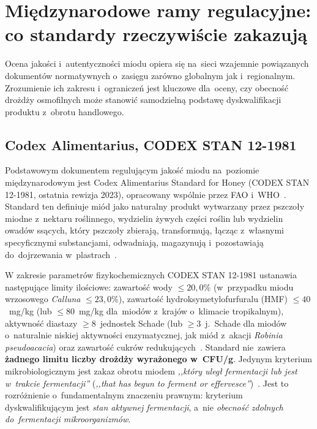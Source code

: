 
\section{Międzynarodowe ramy regulacyjne: co standardy rzeczywiście zakazują}

Ocena jakości i~autentyczności miodu opiera się na~sieci wzajemnie
powiązanych dokumentów normatywnych o~zasięgu zarówno globalnym jak i~regionalnym.
Zrozumienie ich zakresu i~ograniczeń jest kluczowe dla~oceny, czy obecność drożdży osmofilnych może stanowić samodzielną podstawę
dyskwalifikacji produktu z~obrotu handlowego. 

\subsection{Codex Alimentarius, CODEX STAN 12-1981}

Podstawowym dokumentem regulującym jakość miodu na~poziomie
międzynarodowym jest Codex Alimentarius Standard for Honey
(CODEX STAN 12-1981, ostatnia rewizja 2023), opracowany wspólnie
przez FAO i~WHO~\cite{codex_stan12}. Standard ten definiuje miód
jako naturalny produkt wytwarzany przez pszczoły  miodne
z~nektaru roślinnego, wydzielin żywych części roślin lub wydzielin
owadów ssących, który pszczoły zbierają, transformują, łącząc z~własnymi specyficznymi substancjami, odwadniają, magazynują
i~pozostawiają do~dojrzewania w~plastrach~\cite{codex_stan12}.

W zakresie parametrów fizykochemicznych CODEX STAN 12-1981 ustanawia
następujące limity ilościowe: zawartość wody $\leq 20{,}0\%$ (w~przypadku
miodu wrzosowego \textit{Calluna} $\leq 23{,}0\%$), zawartość
hydroksymetylofurfuralu (HMF) $\leq 40$~mg/kg (lub $\leq 80$~mg/kg
dla~miodów z~krajów o~klimacie tropikalnym), aktywność diastazy
$\geq 8$~jednostek Schade (lub $\geq 3$~j.~Schade dla miodów
o~naturalnie niskiej aktywności enzymatycznej, jak miód z~akacji
\textit{Robinia pseudoacacia}) oraz zawartość cukrów
redukujących~\cite{codex_stan12}. Standard nie~zawiera \textbf{żadnego
limitu liczby drożdży wyrażonego w~CFU/g}. Jedynym kryterium
mikrobiologicznym jest zakaz obrotu miodem \emph{,,który uległ
fermentacji lub jest w~trakcie fermentacji''} (\textit{,,that has
begun to ferment or effervesce''})~\cite{codex_stan12}. Jest to
rozróżnienie o~fundamentalnym znaczeniu prawnym: kryterium
dyskwalifikującym jest \emph{stan aktywnej fermentacji}, a~nie
\emph{obecność zdolnych do~fermentacji mikroorganizmów}.

